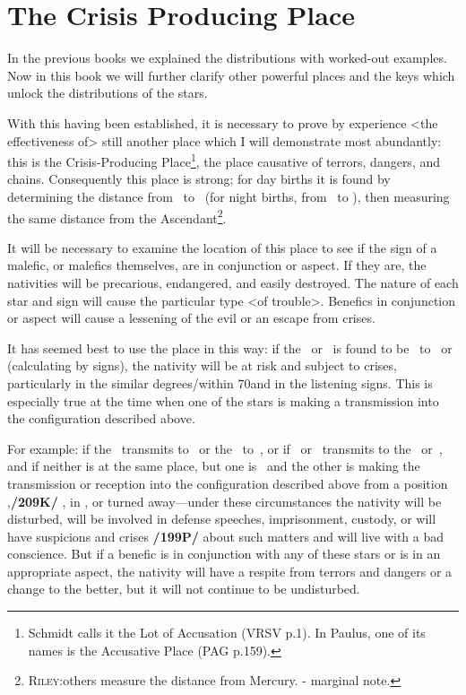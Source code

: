 \section{The Crisis Producing Place}

In the previous books we explained the distributions with worked-out examples. Now in this book we will further clarify other powerful places and the keys which unlock the distributions of the stars.

With this having been established, it is necessary to prove by experience <the effectiveness of> still another place which I will demonstrate most abundantly: this is the Crisis-Producing Place\footnote{Schmidt calls it the Lot of Accusation (VRSV p.1). In Paulus, one of its names is the Accusative Place (PAG p.159).}, the place causative of terrors, dangers, and chains. Consequently this place is strong; for day births it is found by determining the distance from \Saturn\, to \Mars\, (for night births, from \Mars\, to \Saturn), then measuring the same distance from the Ascendant\footnote{\textsc{Riley:}others measure the distance from Mercury. - marginal note.}.

It will be necessary to examine the location of this place to see if the
sign of a malefic, or malefics themselves, are in conjunction or aspect. If they are, the nativities will be precarious, endangered, and easily destroyed. The nature of each star and sign will cause the particular type <of trouble>. Benefics in conjunction or aspect will cause a lessening of the evil or an escape from crises.

It has seemed best to use the place in this way: if the \Sun\, or \Moon\, is found to be \Sextile\, to \Saturn\, or \Mars\, (calculating by signs), the nativity will be at risk and subject to crises, particularly in the similar degrees/within 70\deg and in the listening signs. This is especially true at the time when one of the stars is making a transmission into the configuration described above. 

For example: if the \Sun\, transmits to \Saturn\,
or the \Moon\, to \Mars\,, or if \Saturn\, or \Mars\, transmits to the \Sun\, or \Moon\,, and if neither is at the same place, but one is \Sextile\, and the other is making the transmission or reception into the configuration described
above from a position \Square,\textbf{/209K/} \Trine, in \Opposition, or turned away—under these circumstances the nativity will be disturbed, will be involved in defense speeches, imprisonment, custody, or will have suspicions and crises \textbf{/199P/} about such matters and will live with a bad conscience. But if a benefic is in conjunction with any of these stars or is in an appropriate aspect, the nativity will have a respite from terrors and dangers or a change to the better, but it will not continue to be undisturbed. 

